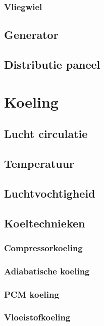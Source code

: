\documentclass[a4paper,12pt,twoside,openright,titlepage]{book}
\begin{document}
\subsection{Vliegwiel}

\section{Generator}

\section{Distributie paneel}


\chapter{Koeling}

\section{Lucht circulatie}

\section{Temperatuur}

\section{Luchtvochtigheid}

\section{Koeltechnieken}
\subsection{Compressorkoeling}

\subsection{Adiabatische koeling}

\subsection{PCM koeling}

\subsection{Vloeistofkoeling}

\end{document}

